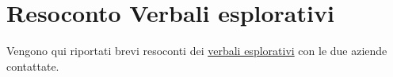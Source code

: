 \section{Resoconto Verbali esplorativi}\label{section:resoconto_verbali}

Vengono qui riportati brevi resoconti dei \href{https://yakuzaishi-swe.github.io/docs/}{verbali esplorativi} con le due aziende contattate.

